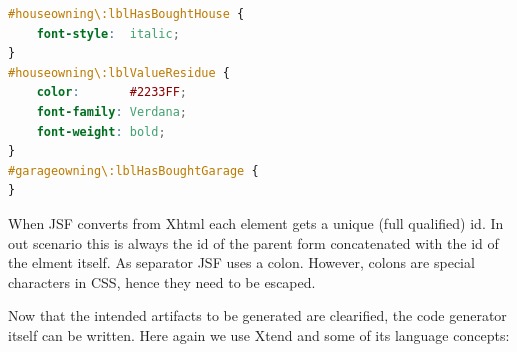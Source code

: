 \begin{lstlisting}[language=CSS]
#houseowning\:lblHasBoughtHouse {
	font-style:  italic; 	
}
#houseowning\:lblValueResidue {
	color:       #2233FF; 
	font-family: Verdana; 	
	font-weight: bold; 		
}
#garageowning\:lblHasBoughtGarage {
}
\end{lstlisting}

When JSF converts from Xhtml each element gets a unique (full qualified) id. In
out scenario this is always the id of the parent form concatenated with the id of
the elment itself. As separator JSF uses a colon. However, colons are special characters
in CSS, hence they need to be escaped.

Now that the intended artifacts to be generated are clearified, the code generator
itself can be written. Here again we use Xtend and some of its language concepts:


